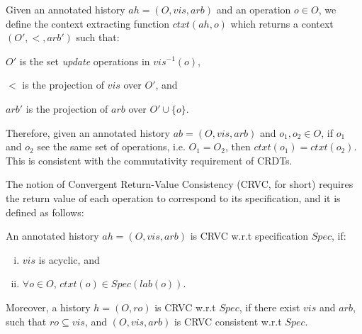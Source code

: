 Given an annotated history $ah = (O,\mathit{vis},\mathit{arb})$ and an
operation $o \in O$, we define the context extracting function $ctxt(ah, o)$
which returns a context $(O', <, \mathit{arb'})$ such that:
\begin{inparaenum}[(i)]
\item $O'$ is the set \emph{update} operations in $\mathit{vis}^{-1}(o)$,
\item $<$ is the projection of $\mathit{vis}$ over $O'$, and
\item $\mathit{arb'}$ is the projection of $\mathit{arb}$ over $O' \cup \{o\}$.
\end{inparaenum} Therefore, given an annotated history $ab =
(O,\mathit{vis},\mathit{arb})$ and $o_1,o_2 \in O$, if $o_1$ and $o_2$
see the same set of operations, i.e. $O_1 = O_2$, then $ctxt(o_1) = ctxt(o_2)$.
%
This is consistent with the commutativity requirement of CRDTs.
%

The notion of Convergent Return-Value Consistency (CRVC, for short)
requires the return value of each operation to correspond to its
specification, and it is defined as follows:

\begin{definition}
\label{definition:strong return value consistency}
An annotated history $ah = (O,\mathit{vis},\mathit{arb})$ is CRVC w.r.t specification $\mathit{Spec}$, if:
\begin{enumerate}[(i)]
\item $\mathit{vis}$ is acyclic, and
\item $\forall o \in O$, $\mathit{ctxt}(o) \in Spec(\mathit{lab}(o))$.
\end{enumerate}

Moreover, a history $h = (O,\mathit{ro})$ is CRVC w.r.t $\mathit{Spec}$, if
there exist $\mathit{vis}$ and $\mathit{arb}$, such that $\mathit{ro}
\subseteq \mathit{vis}$, and $(O,\mathit{vis},\mathit{arb})$ is CRVC
consistent w.r.t $\mathit{Spec}$.
\end{definition}


